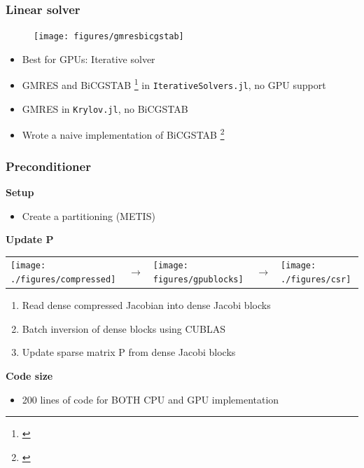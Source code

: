 \begin{frame}
  \frametitle{Linear solver}
    \begin{figure}
      \texttt{[image: figures/gmresbicgstab]}
    \end{figure}
  \begin{itemize}
    \item Best for GPUs: Iterative solver
    \item GMRES and BiCGSTAB \footnote{\cite{sleijpen1993bicgstab}} in \lstinline{IterativeSolvers.jl}, no GPU support 
    \item GMRES in \lstinline{Krylov.jl}, no BiCGSTAB 
    \item Wrote a naive implementation of BiCGSTAB \footnote{\cite{bicgstabVorst}}
  \end{itemize}
\end{frame}

\begin{frame}
  \frametitle{Preconditioner}
  {\bf Setup}
  \begin{itemize}
    \item Create a partitioning (METIS)
  \end{itemize}
  {\bf Update P}
  \begin{tabular}{m{}m{}m{}m{}m{}}
        \texttt{[image: ./figures/compressed]}
    &
    {\Huge $\rightarrow$}
    &
        \texttt{[image: figures/gpublocks]}
    &
    {\Huge $\rightarrow$}
    &
        \texttt{[image: ./figures/csr]}
    \\
  \end{tabular}
    \begin{enumerate}
      \item Read dense compressed Jacobian into dense Jacobi blocks
      \item Batch inversion of dense blocks using CUBLAS
      \item Update sparse matrix P from dense Jacobi blocks
    \end{enumerate}
  {\bf Code size}
  \begin{itemize}
    \item 200 lines of code for BOTH CPU and GPU implementation
  \end{itemize}
\end{frame}

